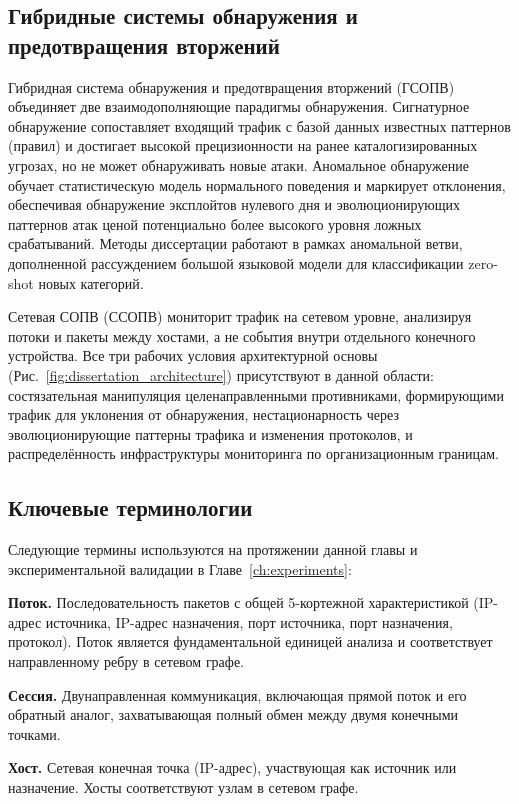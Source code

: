 \subsection{Гибридные системы обнаружения и предотвращения вторжений}

Гибридная система обнаружения и предотвращения вторжений (ГСОПВ)~\cite{Buczak2016,Ahmad2021,Aldweesh2020,Ferrag2020,Paxson1999} объединяет две взаимодополняющие парадигмы обнаружения. Сигнатурное обнаружение сопоставляет входящий трафик с базой данных известных паттернов (правил) и достигает высокой прецизионности на ранее каталогизированных угрозах, но не может обнаруживать новые атаки. Аномальное обнаружение обучает статистическую модель нормального поведения и маркирует отклонения, обеспечивая обнаружение эксплойтов нулевого дня и эволюционирующих паттернов атак ценой потенциально более высокого уровня ложных срабатываний. Методы диссертации работают в рамках аномальной ветви, дополненной рассуждением большой языковой модели для классификации zero-shot новых категорий.

Сетевая СОПВ (ССОПВ) мониторит трафик на сетевом уровне, анализируя потоки и пакеты между хостами, а не события внутри отдельного конечного устройства. Все три рабочих условия архитектурной основы (Рис.~\ref{fig:dissertation_architecture}) присутствуют в данной области: состязательная манипуляция целенаправленными противниками, формирующими трафик для уклонения от обнаружения, нестационарность через эволюционирующие паттерны трафика и изменения протоколов, и распределённость инфраструктуры мониторинга по организационным границам.


\subsection{Ключевые терминологии}

Следующие термины используются на протяжении данной главы и экспериментальной валидации в Главе~\ref{ch:experiments}:

\noindent\textbf{Поток.} Последовательность пакетов с общей 5-кортежной характеристикой (IP-адрес источника, IP-адрес назначения, порт источника, порт назначения, протокол). Поток является фундаментальной единицей анализа и соответствует направленному ребру в сетевом графе.

\noindent\textbf{Сессия.} Двунаправленная коммуникация, включающая прямой поток и его обратный аналог, захватывающая полный обмен между двумя конечными точками.

\noindent\textbf{Хост.} Сетевая конечная точка (IP-адрес), участвующая как источник или назначение. Хосты соответствуют узлам в сетевом графе.

